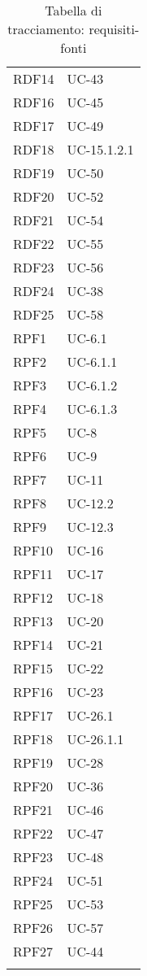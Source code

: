 \begin{longtable}{| p{5cm} | p{5cm} |}
		\rowcolor{LightGray}
		RDF14 & UC-43\\
		RDF16 & UC-45\\
		\rowcolor{LightGray}
		RDF17 & UC-49 \\
		RDF18 & UC-15.1.2.1 \\
		\rowcolor{LightGray}
		RDF19 & UC-50 \\
		RDF20 & UC-52 \\
		\rowcolor{LightGray}
		RDF21 & UC-54 \\
		RDF22 & UC-55 \\
		\rowcolor{LightGray}
		RDF23 & UC-56 \\
		RDF24 & UC-38\\
		RDF25 & UC-58\\
		RPF1 & UC-6.1\\
		\rowcolor{LightGray}
		RPF2 & UC-6.1.1\\
		RPF3 & UC-6.1.2\\
		\rowcolor{LightGray}
		RPF4 & UC-6.1.3\\
		RPF5 & UC-8\\
		\rowcolor{LightGray}
		RPF6 & UC-9\\
		RPF7 & UC-11\\
		\rowcolor{LightGray}
		RPF8 & UC-12.2\\
		RPF9 & UC-12.3\\
		\rowcolor{LightGray}
		RPF10 & UC-16\\
		RPF11 & UC-17\\
		\rowcolor{LightGray}
		RPF12 & UC-18\\
		RPF13 & UC-20\\
		\rowcolor{LightGray}
		RPF14 & UC-21\\
		RPF15 & UC-22\\
		\rowcolor{LightGray}
		RPF16 & UC-23\\
		RPF17 & UC-26.1\\
		\rowcolor{LightGray}
		RPF18 & UC-26.1.1\\
		RPF19 & UC-28\\
		\rowcolor{LightGray}
		RPF20 & UC-36\\
		RPF21 & UC-46\\
		\rowcolor{LightGray}
		RPF22 & UC-47\\
		RPF23 & UC-48\\
		\rowcolor{LightGray}
		RPF24 & UC-51\\
		RPF25 & UC-53\\
		\rowcolor{LightGray}
		RPF26 & UC-57\\	
		RPF27 & UC-44\\
		\rowcolor{LightGray}
		\hline
		\caption{Tabella di tracciamento: requisiti-fonti}
\end{longtable}

